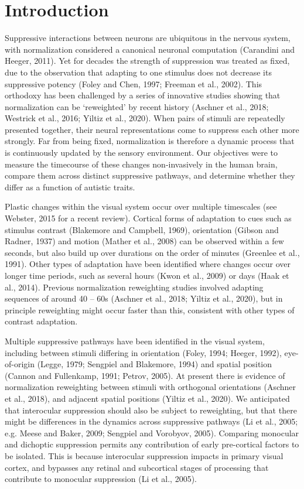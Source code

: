\documentclass[
]{article}
\begin{document}
\hypertarget{introduction}{%
\section{Introduction}\label{introduction}}

Suppressive interactions between neurons are ubiquitous in the nervous system, with normalization considered a canonical neuronal computation (Carandini and Heeger, 2011). Yet for decades the strength of suppression was treated as fixed, due to the observation that adapting to one stimulus does not decrease its suppressive potency (Foley and Chen, 1997; Freeman et al., 2002). This orthodoxy has been challenged by a series of innovative studies showing that normalization can be `reweighted' by recent history (Aschner et al., 2018; Westrick et al., 2016; Yiltiz et al., 2020). When pairs of stimuli are repeatedly presented together, their neural representations come to suppress each other more strongly. Far from being fixed, normalization is therefore a dynamic process that is continuously updated by the sensory environment. Our objectives were to measure the timecourse of these changes non-invasively in the human brain, compare them across distinct suppressive pathways, and determine whether they differ as a function of autistic traits.

Plastic changes within the visual system occur over multiple timescales (see Webster, 2015 for a recent review). Cortical forms of adaptation to cues such as stimulus contrast (Blakemore and Campbell, 1969), orientation (Gibson and Radner, 1937) and motion (Mather et al., 2008) can be observed within a few seconds, but also build up over durations on the order of minutes (Greenlee et al., 1991). Other types of adaptation have been identified where changes occur over longer time periods, such as several hours (Kwon et al., 2009) or days (Haak et al., 2014). Previous normalization reweighting studies involved adapting sequences of around 40 -- 60s (Aschner et al., 2018; Yiltiz et al., 2020), but in principle reweighting might occur faster than this, consistent with other types of contrast adaptation.

Multiple suppressive pathways have been identified in the visual system, including between stimuli differing in orientation (Foley, 1994; Heeger, 1992), eye-of-origin (Legge, 1979; Sengpiel and Blakemore, 1994) and spatial position (Cannon and Fullenkamp, 1991; Petrov, 2005). At present there is evidence of normalization reweighting between stimuli with orthogonal orientations (Aschner et al., 2018), and adjacent spatial positions (Yiltiz et al., 2020). We anticipated that interocular suppression should also be subject to reweighting, but that there might be differences in the dynamics across suppressive pathways (Li et al., 2005; e.g. Meese and Baker, 2009; Sengpiel and Vorobyov, 2005). Comparing monocular and dichoptic suppression permits any contribution of early pre-cortical factors to be isolated. This is because interocular suppression impacts in primary visual cortex, and bypasses any retinal and subcortical stages of processing that contribute to monocular suppression (Li et al., 2005).
\end{document}
